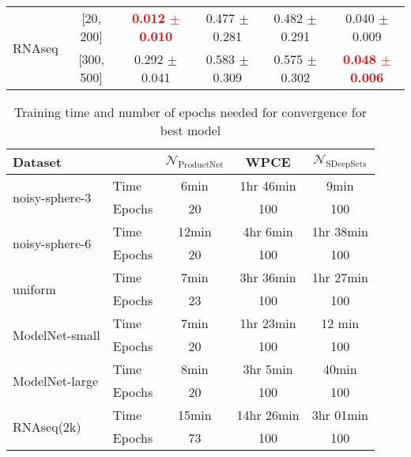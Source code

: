 \documentclass[12pt]{article}
\newcommand{\Network}{\mathcal{N}_{\mathrm{ProductNet}}}
\begin{document}
\begin{table}[t]
\begin{tabular}{lccccc}
         \midrule
         \multirow{2}{*}{RNAseq} & [20, 200] & \textbf{\textcolor{red}{0.012 $\pm$ 0.010}} & 0.477 $\pm$ 0.281 & 0.482 $\pm$ 0.291 & 0.040 $\pm$ 0.009 \\
         & [300, 500] & 0.292 $\pm$ 0.041 &0.583 $\pm$ 0.309  & 0.575 $\pm$ 0.302 &  \textbf{\textcolor{red}{0.048 $\pm$ 0.006}}\\
         \bottomrule
    \end{tabular}
    \label{tab:Wasserstein-error}
\end{table}


\begin{table}[t]
    \centering
    \caption{Training time and number of epochs needed for convergence for best model} %
    \begin{tabular}{llccc}
          \toprule
          Dataset &  & $\Network$ & WPCE & $\mathcal{N}_{\mathrm{SDeepSets}}$ \\
          \midrule
          \multirow{2}{*}{noisy-sphere-3} & Time & 6min & 1hr 46min & 9min \\
         & Epochs & 20 & 100 & 100 \\
         \midrule
         \multirow{2}{*}{noisy-sphere-6} & Time & 12min & 4hr 6min & 1hr 38min\\
         & Epochs & 20 & 100 & 100 \\
         \midrule
         \multirow{2}{*}{uniform} & Time & 7min & 3hr 36min & 1hr 27min\\
         & Epochs & 23 & 100 & 100 \\
         \midrule
         \multirow{2}{*}{ModelNet-small} & Time & 7min & 1hr 23min & 12 min  \\
         & Epochs & 20 & 100 & 100\\
         \midrule
         \multirow{2}{*}{ModelNet-large} & Time & 8min & 3hr 5min & 40min \\
         & Epochs & 20 & 100 & 100\\
         \midrule
         \multirow{2}{*}{RNAseq(2k)} & Time & 15min & 14hr 26min & 3hr 01min\\
         & Epochs & 73 & 100 & 100\\
         \bottomrule
    \end{tabular}
    \label{tab:training-time}
\end{table}
\end{document}
